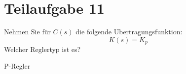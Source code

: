 \section{Teilaufgabe 11}
\begin{aufgabe}
    Nehmen Sie für $C(s)$ die folgende Ubertragungsfunktion: 
    \[ K(s) = K_p \]
    Welcher Reglertyp ist es?
\end{aufgabe}
P-Regler
